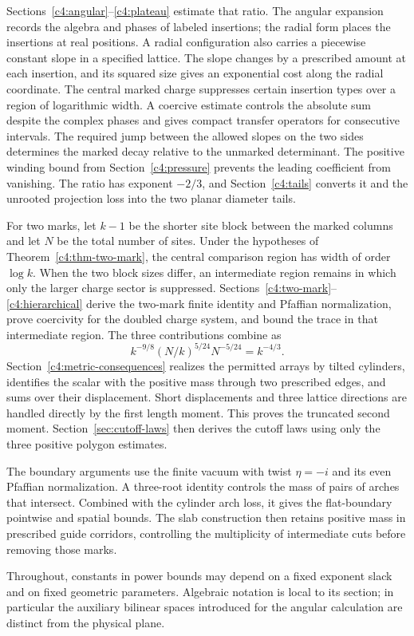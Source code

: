 Sections~\ref{c4:angular}--\ref{c4:plateau} estimate that ratio. The
angular expansion records the algebra and phases of labeled
insertions; the radial form places the insertions at real positions.
A radial configuration also carries a piecewise constant slope in a
specified lattice. The slope changes by a prescribed amount at each
insertion, and its squared size gives an exponential cost along the
radial coordinate. The central marked charge suppresses certain
insertion types over a region of logarithmic width. A coercive estimate
controls the absolute sum despite the complex phases and gives compact
transfer operators for consecutive intervals. The required jump
between the allowed slopes on the two sides determines the marked
decay relative to the unmarked determinant. The positive winding bound
from Section~\ref{c4:pressure} prevents the leading coefficient from
vanishing. The ratio has exponent $-2/3$, and
Section~\ref{c4:tails} converts it and the unrooted projection loss into
the two planar diameter tails.

For two marks, let $k-1$ be the shorter site block between the marked
columns and let $N$ be the total number of sites. Under the hypotheses
of Theorem~\ref{c4:thm-two-mark}, the central comparison region has
width of order $\log k$. When the two block sizes differ, an
intermediate region remains in which only the larger charge sector is
suppressed. Sections~\ref{c4:two-mark}--\ref{c4:hierarchical} derive the
two-mark finite identity and Pfaffian normalization, prove coercivity
for the doubled charge system, and bound the trace in that intermediate
region. The three contributions combine as
\[
       k^{-9/8}(N/k)^{5/24}N^{-5/24}=k^{-4/3}.
\]
Section~\ref{c4:metric-consequences} realizes the permitted arrays by
tilted cylinders, identifies the scalar with the positive mass through
two prescribed edges, and sums over their displacement. Short
displacements and three lattice directions are handled directly by the
first length moment. This proves the truncated second moment.
Section~\ref{sec:cutoff-laws} then derives the cutoff laws using only
the three positive polygon estimates.

The boundary arguments use the finite vacuum with twist $\eta=-i$ and
its even Pfaffian normalization. A three-root identity controls the mass
of pairs of arches that intersect. Combined with the cylinder arch loss,
it gives the flat-boundary pointwise and spatial bounds. The slab
construction then retains positive mass in prescribed guide corridors,
controlling the multiplicity of intermediate cuts before removing those
marks.

Throughout, constants in power bounds may depend on a fixed exponent
slack and on fixed geometric parameters.  Algebraic notation is local
to its section; in particular the auxiliary bilinear spaces introduced
for the angular calculation are distinct from the physical plane.
